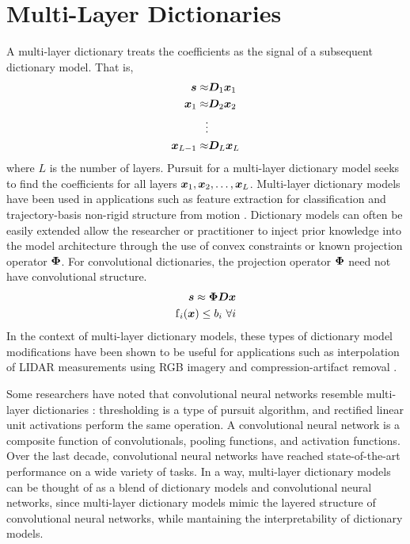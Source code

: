 \section{Multi-Layer Dictionaries}
A multi-layer dictionary treats the coefficients as the signal of a subsequent dictionary model. That is,
\begin{equation}
\begin{split}
\bm{s} \approx & \bm{D}_1\bm{x}_1
\\
\bm{x}_1 \approx & \bm{D}_2\bm{x}_2
\\
\vdots & 
\\
\bm{x}_{L - 1} \approx & \bm{D}_L\bm{x}_L
\end{split}
\end{equation}
where $L$ is the number of layers. Pursuit for a multi-layer dictionary model seeks to find the coefficients for all layers $\bm{x}_1,\bm{x}_2,\hdots,\bm{x}_L$. Multi-layer dictionary models have been used in applications such as feature extraction for classification \cite{chen2013deep}\cite{zeiler2010deconvolutional}\cite{pu2014bayesian} and trajectory-basis non-rigid structure from motion \cite{chodosh2020use}. Dictionary models can often be easily extended allow the researcher or practitioner to inject prior knowledge into the model architecture through the use of convex constraints or known projection operator $\bm{\Phi}$. For convolutional dictionaries, the projection operator $\bm{\Phi}$ need not have convolutional structure.
%
\begin{equation}
\begin{split}
\bm{s} \approx \bm{\Phi}\bm{D}\bm{x}
\\
\operatorname{f}_i(\bm{x}) \leq b_i \text{ } \forall i
\end{split}
\end{equation}
%
In the context of multi-layer dictionary models, these types of dictionary model modifications have been shown to be useful for applications such as interpolation of LIDAR measurements using RGB imagery \cite{murdock2018deep}\cite{chodosh2018deep} and compression-artifact removal \cite{chodosh2020use}.

Some researchers have noted that convolutional neural networks resemble multi-layer dictionaries \cite{papyan2017convolutional}: thresholding is a type of pursuit algorithm, and rectified linear unit activations perform the same operation. A convolutional neural network is a composite function of convolutionals, pooling functions, and activation functions. Over the last decade, convolutional neural networks have reached state-of-the-art performance on a wide variety of tasks. In a way, multi-layer dictionary models can be thought of as a blend of dictionary models and convolutional neural networks, since multi-layer dictionary models mimic the layered structure of convolutional neural networks, while mantaining the interpretability of dictionary models.


